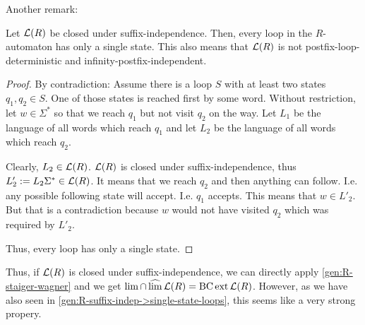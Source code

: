 Another remark:
\begin{lemma}
\label{gen:R-suffix-indep->single-state-loops}
Let $\mathcal{L}(R)$ be closed under suffix-independence. Then, every loop in the $R$-automaton has only a single state. This also means that $\mathcal{L}(R)$ is not postfix-loop-deterministic and infinity-postfix-independent.
\begin{proof}
By contradiction: Assume there is a loop $S$ with at least two states $q_1,q_2 \in S$. One of those states is reached first by some word. Without restriction, let $w \in \Sigma^*$ so that we reach $q_1$ but not visit $q_2$ on the way. Let $L_1$ be the language of all words which reach $q_1$ and let $L_2$ be the language of all words which reach $q_2$.

Clearly, $L_2 \in \mathcal{L}(R)$. $\mathcal{L}(R)$ is closed under suffix-independence, thus $L'_2 := L_2 \Sigma^* \in \mathcal{L}(R)$. It means that we reach $q_2$ and then anything can follow. I.e. any possible following state will accept. I.e. $q_1$ accepts. This means that $w \in L'_2$. But that is a contradiction because $w$ would not have visited $q_2$ which was required by $L'_2$.

Thus, every loop has only a single state.
\end{proof}
\end{lemma}

Thus, if $\mathcal{L}(R)$ is closed under suffix-independence, we can directly apply \cref{gen:R-staiger-wagner} and we get $\lim \cap \operatorname{\widehat{lim}} \mathcal{L}(R) = \operatorname{BC} \operatorname{ext} \mathcal{L}(R)$. However, as we have also seen in \cref{gen:R-suffix-indep->single-state-loops}, this seems like a very strong propery.
